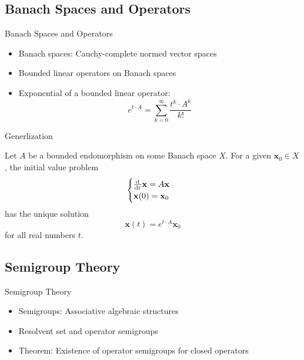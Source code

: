 \documentclass{beamer}
\begin{document}
\subsection{Banach Spaces and Operators}

\begin{frame}{Banach Spaces and Operators}
    \begin{itemize}[<+-| alert@+>]
        \item Banach spaces: Cauchy-complete normed vector spaces
        \item Bounded linear operators on Banach spaces
        \item Exponential of a bounded linear operator: 
        \[
            e^{t \cdot A} = \sum_{k=0}^{\infty} \frac{t^k \cdot A^k}{k!}
        \]
    \end{itemize}
\end{frame}

\begin{frame}{Generlization}
    \begin{theorem}
        Let \(A\) be a bounded endomorphism on some Banach space \(X\). For a given \(\mathbf{x}_0 \in X\), the initial value problem
        \[
        \begin{cases}
            \diff{t} \mathbf{x} = A \mathbf{x} \\
            \mathbf{x}(0) = \mathbf{x}_0
        \end{cases}
        \]
        has the unique solution
        \[
        \mathbf{x}(t) = e^{t \cdot A} \mathbf{x}_0
        \]
        for all real numbers \(t\).
    \end{theorem}
\end{frame}



\subsection{Semigroup Theory}

\begin{frame}{Semigroup Theory}
    \begin{itemize}[<+-| alert@+>]
        \item Semigroups: Associative algebraic structures
        \item Resolvent set and operator semigroups
        \item Theorem: Existence of operator semigroups for closed operators
    \end{itemize}
\end{frame}
\end{document}

